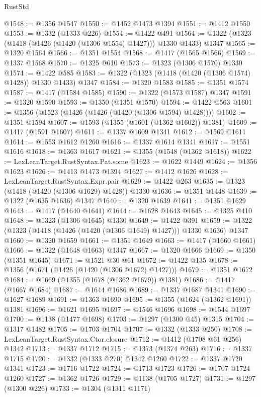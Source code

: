 \begin{lexlean}{RustStd}
\begin{coremodule}
{\begin{coremodule}
{{{{{{{{{{{{{{{{{{{{{{{{{{{{{{{{{{@1548 := @1356 @1547
@1550 := @1452 @1473 @1394
@1551 := @1412 @1550
@1553 := @1332 (@1333 @226)
@1554 := @1422 @491
@1564 := @1322 (@1323 (@1418 (@1426 (@1420 (@1306 @1554) @1427))) @1330 @1433) @1347
@1565 := @1320 @1564
@1566 := @1351 @1554
@1568 := @1417 (@1565 @1566)
@1569 := @1337 @1568
@1570 := @1325 @610
@1573 := @1323 (@1306 @1570) @1330
@1574 := @1422 @585
@1583 := @1322 (@1323 (@1418 (@1420 (@1306 @1574) @1428)) @1330 @1433) @1347
@1584 := @1320 @1583
@1585 := @1351 @1574
@1587 := @1417 (@1584 @1585)
@1590 := @1322 (@1573 @1587) @1347
@1591 := @1320 @1590
@1593 := @1350 (@1351 @1570)
@1594 := @1422 @563
@1601 := @1356 (@1523 (@1426 (@1426 (@1420 (@1306 @1594) @1428))))
@1602 := @1351 @1594
@1607 := @1593 (@1355 (@1601 (@1362 @1602)) @1381)
@1609 := @1417 (@1591 @1607)
@1611 := @1337 @1609 @1341
@1612 := @1569 @1611
@1614 := @1553 @1612 @1260
@1616 := @1337 @1614 @1341
@1617 := @1551 @1616
@1618 := @1363 @1617
@1621 := @1355 (@1548 (@1362 @1618))
@1622 := LexLeanTarget.RustSyntax.Pat.some
@1623 := @1622 @1449
@1624 := @1356 @1623
@1626 := @1413 @1473 @1394
@1627 := @1412 @1626
@1628 := LexLeanTarget.RustSyntax.Expr.pair
@1629 := @1422 @263
@1635 := @1323 (@1418 (@1420 (@1306 @1629) @1428)) @1330
@1636 := @1351 @1448
@1639 := @1322 (@1635 @1636) @1347
@1640 := @1320 @1639
@1641 := @1351 @1629
@1643 := @1417 (@1640 @1641)
@1644 := @1628 @1643
@1645 := @1325 @410
@1648 := @1323 (@1306 @1645) @1330
@1649 := @1422 @391
@1659 := @1322 (@1323 (@1418 (@1426 (@1420 (@1306 @1649) @1427))) @1330 @1636) @1347
@1660 := @1320 @1659
@1661 := @1351 @1649
@1663 := @1417 (@1660 @1661)
@1666 := @1322 (@1648 @1663) @1347
@1667 := @1320 @1666
@1669 := @1350 (@1351 @1645)
@1671 := @1521 @30 @61
@1672 := @1422 @135
@1678 := @1356 (@1671 (@1426 (@1420 (@1306 @1672) @1427)))
@1679 := @1351 @1672
@1684 := @1669 (@1355 (@1678 (@1362 @1679)) @1381)
@1686 := @1417 (@1667 @1684)
@1687 := @1644 @1686
@1689 := @1337 @1687 @1341
@1690 := @1627 @1689
@1691 := @1363 @1690
@1695 := @1355 (@1624 (@1362 @1691)) @1381
@1696 := @1621 @1695
@1697 := @1546 @1696
@1698 := @1544 @1697
@1700 := @1138 (@1477 @1698)
@1703 := @1297 (@1300 @45) @1315
@1704 := @1317 @1482
@1705 := @1703 @1704
@1707 := @1332 (@1333 @250)
@1708 := LexLeanTarget.RustSyntax.Ctor.closure
@1712 := @1412 (@1708 @61 @256) @1342
@1713 := @1337 @1712
@1715 := @1373 (@1374 @263)
@1716 := @1337 @1715
@1720 := @1332 (@1333 @270) @1342 @1260
@1722 := @1337 @1720 @1341
@1723 := @1716 @1722
@1724 := @1713 @1723
@1726 := @1707 @1724 @1260
@1727 := @1362 @1726
@1729 := @1138 (@1705 @1727)
@1731 := @1297 (@1300 @226)
@1733 := @1304 (@1311 @1171)
}}}}}}}}}}}}}}}}}}}}}}}}}}}}}}}}}}
\end{coremodule}}
\end{coremodule}
\end{lexlean}
